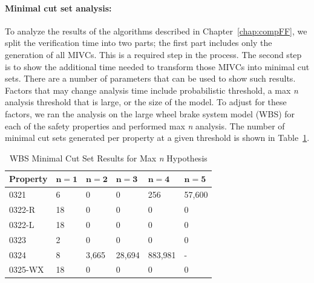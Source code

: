 \paragraph{Minimal cut set analysis:} To analyze the results of the algorithms described in Chapter~\ref{chap:compFF}, we split the verification time into two parts; the first part includes only the generation of all MIVCs. This is a required step in the process. The second step is to show the additional time needed to transform those MIVCs into minimal cut sets. There are a number of parameters that can be used to show such results. Factors that may change analysis time include probabilistic threshold, a max {\em n} analysis threshold that is large, or the size of the model. To adjust for these factors, we ran the analysis on the large wheel brake system model (WBS) for each of the safety properties and performed max \textit{n} analysis. The number of minimal cut sets generated per property at a given threshold is shown in Table~\ref{tab:wbs_maxN_results}.
\begin{table}[htbp]
\begin{center}
    \begin{tabular}{ | l | l | l | l | l | l |}
    \hline
    \textbf{Property} & $\bm{n = 1}$ & $\bm{n = 2}$ & $\bm{n = 3}$ & $\bm{n = 4}$ 
		& $\bm{n = 5}$    \\ \hline \hline
    0321 & 6 & 0 & 0 & 256 & 57,600   \\ \hline
    0322-R & 18 & 0 & 0 & 0 & 0  \\ \hline
    0322-L & 18 & 0 & 0 & 0 & 0  \\ \hline
    0323 & 2 & 0 & 0 & 0 & 0  \\ \hline
    0324 & 8 & 3,665 & 28,694 & 883,981 & - \\ \hline
    0325-WX & 18 & 0 & 0 &0 &0 \\ \hline
    \end{tabular}
    \caption{WBS Minimal Cut Set Results for Max \textit{n} Hypothesis}
    \label{tab:wbs_maxN_results}
    \end{center}
\end{table}

